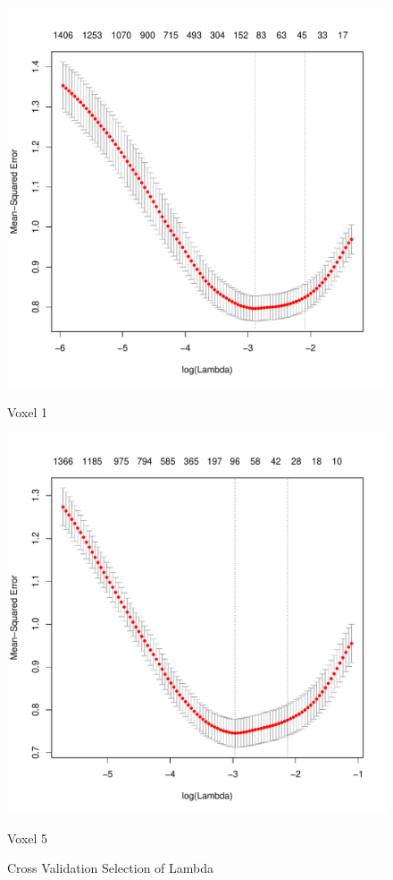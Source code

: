 \documentclass[english]{amsart}
\begin{document}
\begin{figure}[H]
  \includegraphics[width=\linewidth]{cv_lasso1.pdf}
  \caption{Voxel 1}
\endminipage\hfill
\vspace{-5mm}
  \includegraphics[width=\linewidth]{cv_lasso5.pdf}
  \caption{Voxel 5}
\endminipage
\caption{Cross Validation Selection of Lambda}
\end{figure}
\vspace{-20mm}
\end{document}
